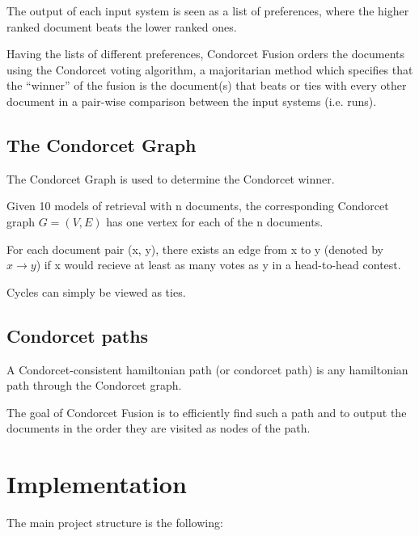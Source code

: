     The output of each input system is seen as a list of preferences, where the higher ranked document beats the lower ranked ones.
    
    Having the lists of different preferences, Condorcet Fusion orders the documents using the Condorcet voting algorithm, a majoritarian method which specifies
    that the ``winner'' of the fusion is the document(s) that beats or ties
    with every other document in a pair-wise comparison between the input
    systems (i.e. runs).    
    

	\subsection{The Condorcet Graph}
	
	The Condorcet Graph is used to determine the Condorcet winner.

	Given 10 models of retrieval with n documents, the corresponding
	Condorcet graph $G = (V, E)$ has one vertex for each of the n documents.

	For each document pair (x, y), there exists an edge from x to
	y (denoted by $x \rightarrow y$) if x would recieve at least as many votes as y in a head-to-head contest.

	Cycles can simply be viewed as ties.


	\subsection{Condorcet paths}

	A Condorcet-consistent hamiltonian path (or condorcet path) is any
	hamiltonian path through the Condorcet graph.

	The goal of Condorcet Fusion is to efficiently find such a path and to output the documents in the order they are visited as nodes of the path.

    \section{Implementation}

	The main project structure is the following:
	
